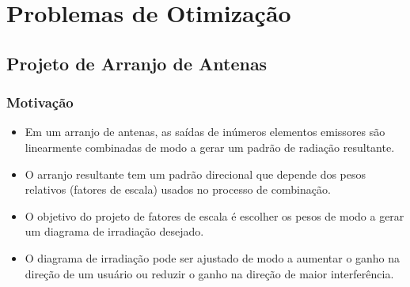 \section{Problemas de Otimização}

\subsection{Projeto de Arranjo de Antenas}

\begin{frame}
\frametitle{Motivação}
\begin{itemize}
\item Em um arranjo de antenas, as sa\'idas de in\'umeros elementos emissores s\~ao linearmente combinadas de modo a gerar um padr\~ao de radiação resultante.

\item O arranjo resultante tem um padr\~ao direcional que depende dos pesos relativos (fatores de escala) usados no processo de combinação.

\item O objetivo do projeto de fatores de escala é escolher os pesos de modo a gerar um diagrama de irradiação desejado.

\item O diagrama de irradiação pode ser ajustado de modo a aumentar o ganho na direção de um usuário ou reduzir o ganho na direção de maior interfer\^encia.


\end{itemize}

\end{frame}

